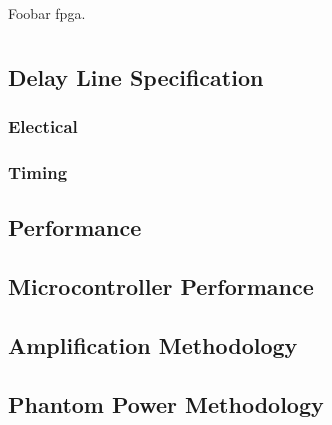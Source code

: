 
\chapter{} \label{sec:intro}
Foobar \cite{aps2000} \gls{fpga}.



\chapter{}

\section{ Delay Line Specification}
\subsection{Electical}

\subsection{Timing}

\section{ Performance}

\section{Microcontroller Performance}

\section{Amplification Methodology}

\section{Phantom Power Methodology}

\chapter{}

\chapter{}


